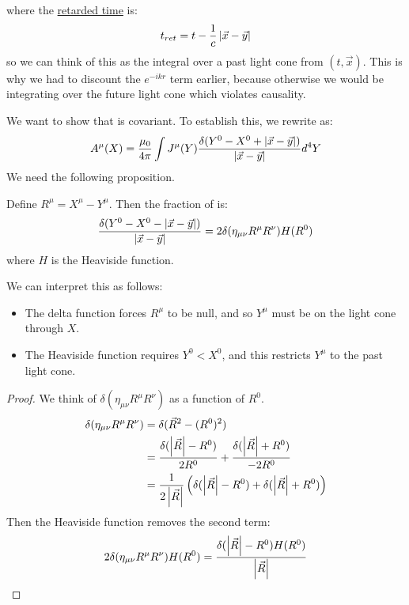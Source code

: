 \documentclass[../Main.tex]{subfiles}
\begin{document}
where the \underline{retarded time} is:
\begin{equation*}
    t_{ret} = t - \frac1c \left|\vec{x} - \vec{y}\right|
\end{equation*}
so we can think of this as the integral over a past light cone from $(t, \vec{x})$. This is why we had to discount the $e^{-ikr}$ term earlier, because otherwise we would be integrating over the future light cone which violates causality.

We want to show that  is covariant. To establish this, we rewrite as:
\begin{equation}
    A^\mu(X) = \frac{\mu_0}{4\pi} \int J^\mu(Y) \frac{\delta(Y^0 - X^0 + \left|\vec{x} - \vec{y}\right|)}{\left|\vec{x} - \vec{y}\right|} d^4Y
    \label{eqnRetardedPotentialRewrite}
\end{equation}
We need the following proposition.
\begin{proposition}
    Define $R^\mu = X^\mu - Y^\mu$. Then the fraction of  is:
    \begin{equation*}
        \frac{\delta(Y^0 - X^0 - \left|\vec{x} - \vec{y}\right|)}{\left|\vec{x} - \vec{y}\right|} = 2\delta(\eta_{\mu \nu} R^\mu R^\nu) H(R^0)
    \end{equation*}
    where $H$ is the Heaviside function.
    \label{propRewriteGreens}
\end{proposition}
We can interpret this as follows:
\begin{itemize}
    \item The delta function forces $R^\mu$ to be null, and so $Y^\mu$ must be on the light cone through $X$.
    \item The Heaviside function requires $Y^0 < X^0$, and this restricts $Y^\mu$ to the past light cone.
\end{itemize}
\begin{proof}
    We think of $\delta(\eta_{\mu \nu} R^\mu R^\nu)$ as a function of $R^0$.
    \begin{align*}
        \delta(\eta_{\mu \nu} R^\mu R^\nu) &= \delta(\vec{R}^2 - (R^0)^2) \\
        &= \frac{\delta(\left|\vec{R}\right| - R^0)}{2R^0} + \frac{\delta(\left|\vec{R}\right| + R^0)}{-2R^0} \\
        &= \frac{1}{2\left|\vec{R}\right|}\left(\delta(\left|\vec{R}\right| - R^0) + \delta(\left|\vec{R}\right| + R^0)\right)
    \end{align*}
    Then the Heaviside function removes the second term:
    \begin{equation*}
        2\delta(\eta_{\mu \nu} R^\mu R^\nu) H(R^0) = \frac{\delta(\left|\vec R\right| - R^0)H(R^0)}{\left|\vec R\right|}
    \end{equation*}
\end{proof}
\end{document}
